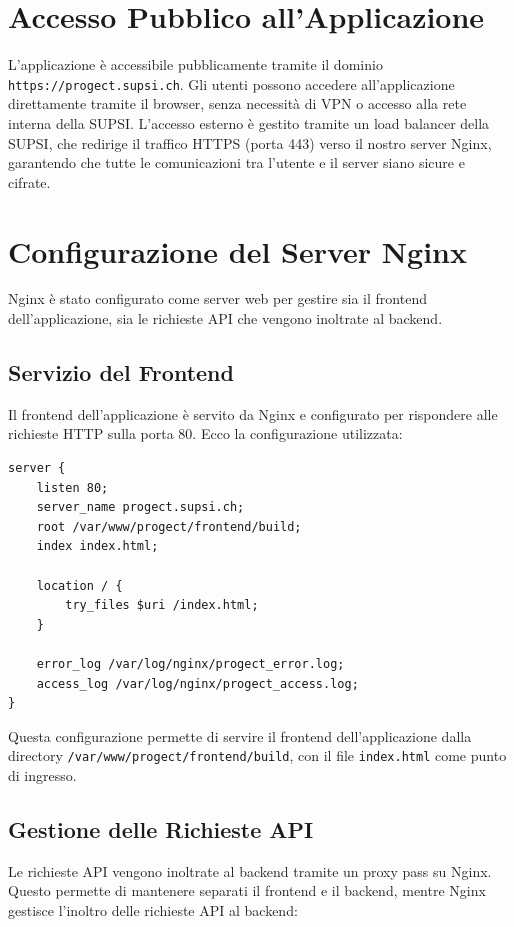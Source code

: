 \documentclass[twoside]{supsistudent}
\begin{document}
\section{Accesso Pubblico all'Applicazione}

L'applicazione è accessibile pubblicamente tramite il dominio \texttt{https://progect.supsi.ch}. Gli utenti possono accedere all'applicazione direttamente tramite il browser, senza necessità di VPN o accesso alla rete interna della SUPSI. L'accesso esterno è gestito tramite un load balancer della SUPSI, che redirige il traffico HTTPS (porta 443) verso il nostro server Nginx, garantendo che tutte le comunicazioni tra l'utente e il server siano sicure e cifrate.

\section{Configurazione del Server Nginx}

Nginx è stato configurato come server web per gestire sia il frontend dell'applicazione, sia le richieste API che vengono inoltrate al backend.

\subsection{Servizio del Frontend}

Il frontend dell'applicazione è servito da Nginx e configurato per rispondere alle richieste HTTP sulla porta 80. Ecco la configurazione utilizzata:

\begin{verbatim}
server {
    listen 80;
    server_name progect.supsi.ch;
    root /var/www/progect/frontend/build;
    index index.html;

    location / {
        try_files $uri /index.html;
    }

    error_log /var/log/nginx/progect_error.log;
    access_log /var/log/nginx/progect_access.log;
}
\end{verbatim}

Questa configurazione permette di servire il frontend dell'applicazione dalla directory \texttt{/var/www/progect/frontend/build}, con il file \texttt{index.html} come punto di ingresso.

\subsection{Gestione delle Richieste API}

Le richieste API vengono inoltrate al backend tramite un proxy pass su Nginx. Questo permette di mantenere separati il frontend e il backend, mentre Nginx gestisce l'inoltro delle richieste API al backend:
\end{document}
